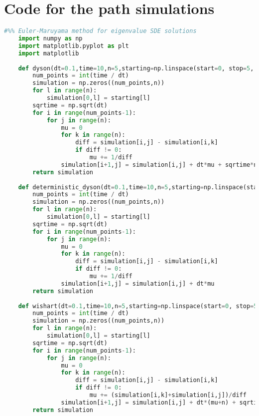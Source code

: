\chapter{Code for the path simulations} \label{appendix:codes}

\begin{lstlisting}[language=Python, caption=Euler-Maruyama algorithm for simulation of eigenvalue processes]
    #%% Euler-Maruyama method for eigenvalue SDE solutions
    import numpy as np
    import matplotlib.pyplot as plt
    import matplotlib
    
    def dyson(dt=0.1,time=10,n=5,starting=np.linspace(start=0, stop=5, num=5)):
        num_points = int(time / dt)
        simulation = np.zeros((num_points,n))
        for l in range(n):
            simulation[0,l] = starting[l]
        sqrtime = np.sqrt(dt)
        for i in range(num_points-1):
            for j in range(n):
                mu = 0
                for k in range(n):
                    diff = simulation[i,j] - simulation[i,k]
                    if diff != 0:
                        mu += 1/diff
                simulation[i+1,j] = simulation[i,j] + dt*mu + sqrtime*np.random.randn()
        return simulation
    
    def deterministic_dyson(dt=0.1,time=10,n=5,starting=np.linspace(start=0, stop=5, num=5)):
        num_points = int(time / dt)
        simulation = np.zeros((num_points,n))
        for l in range(n):
            simulation[0,l] = starting[l]
        sqrtime = np.sqrt(dt)
        for i in range(num_points-1):
            for j in range(n):
                mu = 0
                for k in range(n):
                    diff = simulation[i,j] - simulation[i,k]
                    if diff != 0:
                        mu += 1/diff
                simulation[i+1,j] = simulation[i,j] + dt*mu
        return simulation
    
    def wishart(dt=0.1,time=10,n=5,starting=np.linspace(start=0, stop=5, num=5)):
        num_points = int(time / dt)
        simulation = np.zeros((num_points,n))
        for l in range(n):
            simulation[0,l] = starting[l]
        sqrtime = np.sqrt(dt)
        for i in range(num_points-1):
            for j in range(n):
                mu = 0
                for k in range(n):
                    diff = simulation[i,j] - simulation[i,k]
                    if diff != 0:
                        mu += (simulation[i,k]+simulation[i,j])/diff
                simulation[i+1,j] = simulation[i,j] + dt*(mu+n) + sqrtime*np.random.randn()*np.sqrt(simulation[i,j])
        return simulation
    

\end{lstlisting}
